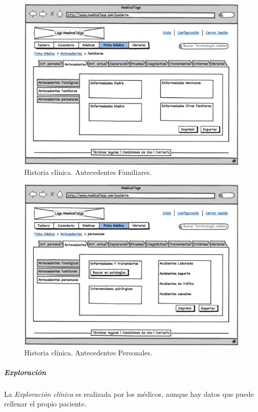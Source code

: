 			\begin{figure}[H]
			  \centering
			    \includegraphics[width=12cm]{img/eps/31_Antecedentes_pacientes1.eps}
			  \caption{Historia clínica. Antecedentes Familiares.}
			  \label{fig:antecedentes_familiares}
			\end{figure}
			
			\begin{figure}[H]
			  \centering
			    \includegraphics[width=12cm]{img/eps/32_Antecedentes_pacientes2.eps}
			  \caption{Historia clínica. Antecedentes Personales.}
			  \label{fig:antecedentes_personales}
			\end{figure}
			
		
		\subparagraph{Exploración} %
		\label{par:interface_exploracion}
		
			La \textit{Exploración clínica} es realizada por los médicos, aunque hay datos que puede rellenar el propio paciente. 
			
